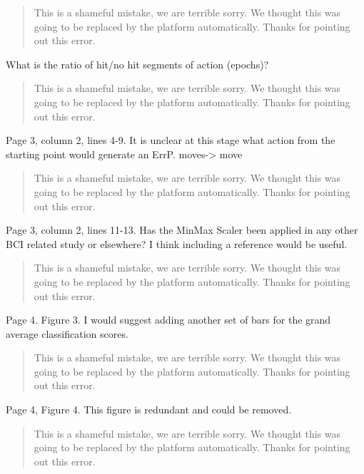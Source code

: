 \documentclass[journal,onecolumn,12pt]{IEEEtran}
\begin{document}
\begin{quotation}
{\color{blue}
This is a shameful mistake, we are terrible sorry.  We thought this was going to be replaced by the platform automatically. Thanks for pointing out this error.
}
\end{quotation}


What is the ratio of hit/no hit segments of action (epochs)?


\begin{quotation}
{\color{blue}
This is a shameful mistake, we are terrible sorry.  We thought this was going to be replaced by the platform automatically. Thanks for pointing out this error.
}
\end{quotation}


Page 3, column 2, lines 4-9. It is unclear at this stage what action from the starting point would generate an ErrP.
moves-> move

\begin{quotation}
{\color{blue}
This is a shameful mistake, we are terrible sorry.  We thought this was going to be replaced by the platform automatically. Thanks for pointing out this error.
}
\end{quotation}


Page 3, column 2, lines 11-13. Has the MinMax Scaler been applied in any other BCI related study or elsewhere? I think including a reference would be useful.

\begin{quotation}
{\color{blue}
This is a shameful mistake, we are terrible sorry.  We thought this was going to be replaced by the platform automatically. Thanks for pointing out this error.
}
\end{quotation}

Page 4. Figure 3. I would suggest adding another set of bars for the grand average classification scores.

\begin{quotation}
{\color{blue}
This is a shameful mistake, we are terrible sorry.  We thought this was going to be replaced by the platform automatically. Thanks for pointing out this error.
}
\end{quotation}

Page 4, Figure 4. This figure is redundant and could be removed.

\begin{quotation}
{\color{blue}
This is a shameful mistake, we are terrible sorry.  We thought this was going to be replaced by the platform automatically. Thanks for pointing out this error.
}
\end{quotation}
\end{document}
